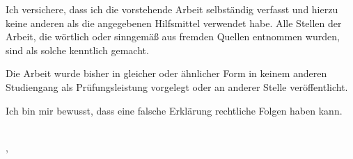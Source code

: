 
Ich versichere, dass ich die vorstehende Arbeit selbständig verfasst und hierzu keine anderen als die angegebenen Hilfsmittel verwendet habe. Alle Stellen der Arbeit, die wörtlich oder sinngemäß aus fremden Quellen entnommen wurden, sind als solche kenntlich gemacht.

Die Arbeit wurde bisher in gleicher oder ähnlicher Form in keinem anderen Studiengang als Prüfungsleistung vorgelegt oder an anderer Stelle veröffentlicht.

Ich bin mir bewusst, dass eine falsche Erklärung rechtliche Folgen haben
kann.

\vspace*{1cm}

\metadataAuthor\\
\metadataPlace,~\metadataSubmitDate
